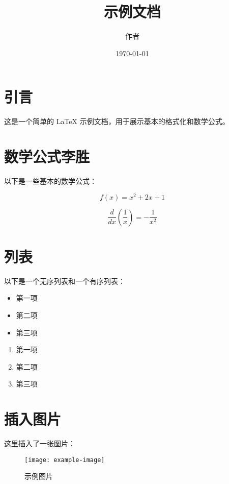 \documentclass{article}
\title{示例文档}
\author{作者}
\date{\today}
\begin{document}
\maketitle

\section{引言}

这是一个简单的 LaTeX 示例文档，用于展示基本的格式化和数学公式。

\section{数学公式李胜}

以下是一些基本的数学公式：

\begin{equation}
  f(x) = x^2 + 2x + 1
\end{equation}

\begin{equation}
  \frac{d}{dx} \left( \frac{1}{x} \right) = -\frac{1}{x^2}
\end{equation}

\section{列表}

以下是一个无序列表和一个有序列表：

\begin{itemize}
  \item 第一项
  \item 第二项
  \item 第三项
\end{itemize}

\begin{enumerate}
  \item 第一项
  \item 第二项
  \item 第三项
\end{enumerate}

\section{插入图片}

这里插入了一张图片：

\begin{figure}[htbp]
  \centering
  \texttt{[image: example-image]}
  \caption{示例图片}
  \label{fig:example}
\end{figure}
\end{document}

